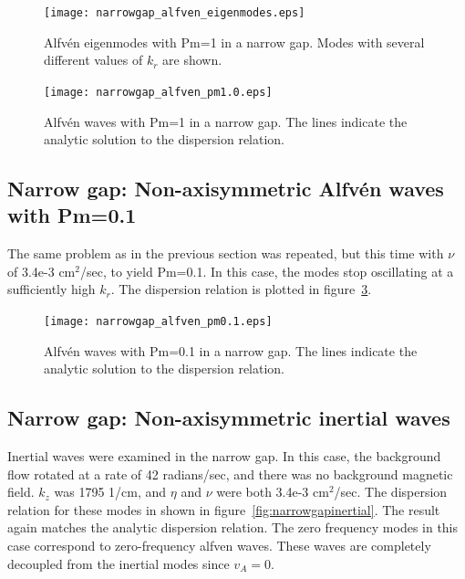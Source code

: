 \documentclass[letterpaper]{article}
\begin{document}
\begin{figure}
\begin{center}
\texttt{[image: narrowgap\_alfven\_eigenmodes.eps]}
\caption{Alfv\'en eigenmodes with Pm=1 in a narrow gap. Modes with
  several different values of $k_r$ are shown.}
\label{fig:narrowgapalfveneigenmodes}
\end{center}
\end{figure}

\begin{figure}
\begin{center}
\texttt{[image: narrowgap\_alfven\_pm1.0.eps]}
\caption{Alfv\'en waves with Pm=1 in a narrow gap.  The lines indicate
  the analytic solution to the dispersion relation.}
\label{fig:narrowgapalfven}
\end{center}
\end{figure}

\subsection{Narrow gap: Non-axisymmetric Alfv\'en waves with Pm=0.1}

The same problem as in the previous section was repeated, but this
time with $\nu$ of 3.4e-3 cm$^2$/sec, to yield Pm=0.1.  In this case,
the modes stop oscillating at a sufficiently high $k_r$.  The
dispersion relation is plotted in
figure~\ref{fig:narrowgapalfvenpm0.1}.

\begin{figure}
\begin{center}
\texttt{[image: narrowgap\_alfven\_pm0.1.eps]}
\caption{Alfv\'en waves with Pm=0.1 in a narrow gap.  The lines
  indicate the analytic solution to the dispersion relation.}
\label{fig:narrowgapalfvenpm0.1}
\end{center}
\end{figure}

\subsection{Narrow gap: Non-axisymmetric inertial waves}
Inertial waves were examined in the narrow gap.  In this case, the
background flow rotated at a rate of 42 radians/sec, and there was no
background magnetic field.  $k_z$ was 1795 1/cm, and $\eta$ and $\nu$
were both 3.4e-3 cm$^2$/sec.  The dispersion relation for these modes
in shown in figure~\ref{fig:narrowgapinertial}.  The result again
matches the analytic dispersion relation.  The zero frequency modes in
this case correspond to zero-frequency alfven waves.  These waves are
completely decoupled from the inertial modes since $v_{A}=0$.
\end{document}
